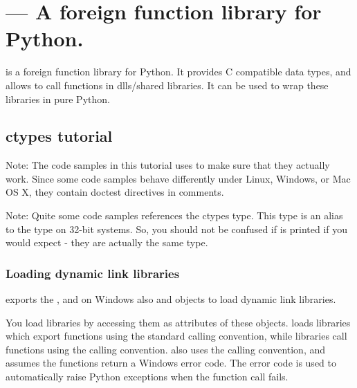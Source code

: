 \ifx\locallinewidth\undefined\newlength{\locallinewidth}\fi
\setlength{\locallinewidth}{\linewidth}
\section{ --- A foreign function library for Python.}

 is a foreign function library for Python.  It provides C
compatible data types, and allows to call functions in dlls/shared
libraries.  It can be used to wrap these libraries in pure Python.


\subsection{ctypes tutorial\label{ctypes-ctypes-tutorial}}

Note: The code samples in this tutorial uses  to make sure
that they actually work.  Since some code samples behave differently
under Linux, Windows, or Mac OS X, they contain doctest directives in
comments.

Note: Quite some code samples references the ctypes  type.
This type is an alias to the  type on 32-bit systems.  So,
you should not be confused if  is printed if you would
expect  - they are actually the same type.


\subsubsection{Loading dynamic link libraries\label{ctypes-loading-dynamic-link-libraries}}

 exports the , and on Windows also  and
 objects to load dynamic link libraries.

You load libraries by accessing them as attributes of these objects.
 loads libraries which export functions using the standard
 calling convention, while  libraries call
functions using the  calling convention.  also
uses the  calling convention, and assumes the functions
return a Windows  error code. The error code is used to
automatically raise  Python exceptions when the
function call fails.

